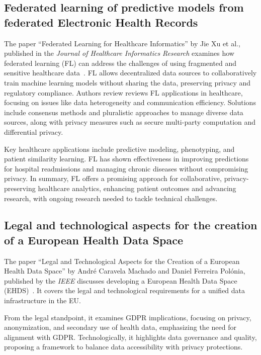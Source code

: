 \subsection{Federated learning of predictive models from federated Electronic Health Records}\label{subsec:federated-learning-of-predictive-models-from-federated-electronic-health-records}

The paper ``Federated Learning for Healthcare Informatics'' by Jie Xu et al., published in the \textit{Journal of Healthcare Informatics Research} examines how federated learning (FL) can address the challenges of using fragmented and sensitive healthcare data~\cite{federated_learning_for_healthcare_infromatics}.
FL allows decentralized data sources to collaboratively train machine learning models without sharing the data, preserving privacy and regulatory compliance.
Authors review reviews FL applications in healthcare, focusing on issues like data heterogeneity and communication efficiency.
Solutions include consensus methods and pluralistic approaches to manage diverse data sources, along with privacy measures such as secure multi-party computation and differential privacy.

Key healthcare applications include predictive modeling, phenotyping, and patient similarity learning.
FL has shown effectiveness in improving predictions for hospital readmissions and managing chronic diseases without compromising privacy.
In summary, FL offers a promising approach for collaborative, privacy-preserving healthcare analytics, enhancing patient outcomes and advancing research, with ongoing research needed to tackle technical challenges.

\subsection{Legal and technological aspects for the creation of a European Health Data Space}\label{subsec:legal-and-technological-aspects-for-the-creation-of-a-european-health-data-space}

The paper ``Legal and Technological Aspects for the Creation of a European Health Data Space'' by André Caravela Machado and Daniel Ferreira Polónia, published by the \textit{IEEE} discusses developing a European Health Data Space (EHDS)~\cite{legal_and_technological_aspects_of_ehds}.
It covers the legal and technological requirements for a unified data infrastructure in the EU.

From the legal standpoint, it examines GDPR implications, focusing on privacy, anonymization, and secondary use of health data, emphasizing the need for alignment with GDPR.
Technologically, it highlights data governance and quality, proposing a framework to balance data accessibility with privacy protections.

